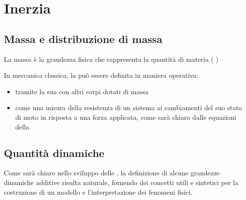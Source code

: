 \documentclass[letterpaper,10pt,italian]{jupyterBook}
\begin{document}
\chapter{Inerzia}
\label{\detokenize{ch/mechanics/inertia:inerzia}}\label{\detokenize{ch/mechanics/inertia:physics-hs-mechanics-inertia}}\label{\detokenize{ch/mechanics/inertia::doc}}

\section{Massa e distribuzione di massa}
\label{\detokenize{ch/mechanics/inertia:massa-e-distribuzione-di-massa}}
\sphinxAtStartPar
La massa è la grandezza fisica che rappresenta la quantità di materia ( )

\sphinxAtStartPar
In meccanica classica, la può essere definita in maniera operativa:
\begin{itemize}
\item {} 
\sphinxAtStartPar
tramite la sua {\hyperref[\detokenize{ch/mechanics/actions-examples:physics-hs-mechanics-actions-gravitation}]{}} con altri corpi dotati di massa

\item {} 
\sphinxAtStartPar
come una misura della resistenza di un sistema ai cambiamenti del suo stato di moto in risposta a una forza applicata, come sarà chiaro dalle equazioni della {\hyperref[\detokenize{ch/mechanics/dynamics:physics-hs-mechanics-dynamics}]{}}

\end{itemize}


\section{Quantità dinamiche}
\label{\detokenize{ch/mechanics/inertia:quantita-dinamiche}}
\sphinxAtStartPar
Come sarà chiaro nello sviluppo delle {\hyperref[\detokenize{ch/mechanics/dynamics-eom-proof-points:physics-hs-mechanics-dynamics-eom-points}]{}}, la definizione di alcune grandezze dinamiche additive risulta naturale, fornendo dei concetti utili e sintetici per la costruzione di un modello e l’interpretazione dei fenomeni fisici.
\end{document}
